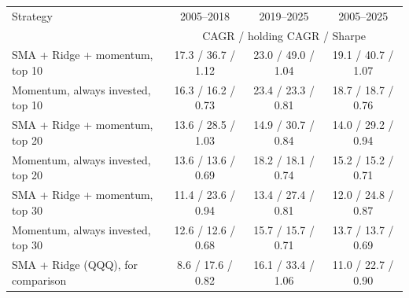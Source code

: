 \begin{tabular}{lccc}
\toprule
Strategy & 2005--2018 & 2019--2025 & 2005--2025 \\
 & \multicolumn{3}{c}{\footnotesize CAGR / holding CAGR / Sharpe} \\
\midrule
SMA + Ridge + momentum, top 10 & 17.3 / 36.7 / 1.12 & 23.0 / 49.0 / 1.04 & 19.1 / 40.7 / 1.07 \\
Momentum, always invested, top 10 & 16.3 / 16.2 / 0.73 & 23.4 / 23.3 / 0.81 & 18.7 / 18.7 / 0.76 \\
\addlinespace
SMA + Ridge + momentum, top 20 & 13.6 / 28.5 / 1.03 & 14.9 / 30.7 / 0.84 & 14.0 / 29.2 / 0.94 \\
Momentum, always invested, top 20 & 13.6 / 13.6 / 0.69 & 18.2 / 18.1 / 0.74 & 15.2 / 15.2 / 0.71 \\
\addlinespace
SMA + Ridge + momentum, top 30 & 11.4 / 23.6 / 0.94 & 13.4 / 27.4 / 0.81 & 12.0 / 24.8 / 0.87 \\
Momentum, always invested, top 30 & 12.6 / 12.6 / 0.68 & 15.7 / 15.7 / 0.71 & 13.7 / 13.7 / 0.69 \\
\addlinespace
SMA + Ridge (QQQ), for comparison & 8.6 / 17.6 / 0.82 & 16.1 / 33.4 / 1.06 & 11.0 / 22.7 / 0.90 \\
\bottomrule
\end{tabular}
